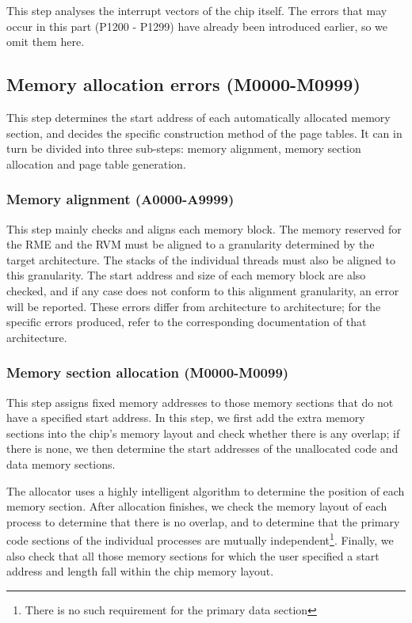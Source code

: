 This step analyses the interrupt vectors of the chip itself. The errors that may occur in this part (P1200 -\/
P1299) have already been introduced earlier, so we omit them here.

\subsection{Memory allocation errors (M0000-M0999)}\label{subsec:5-6-4}

This step determines the start address of each automatically allocated memory section, and decides the specific construction method of the page tables. It can in turn be divided into three sub-steps: memory alignment, memory section allocation and page table generation.

\subsubsection{Memory alignment (A0000-A9999)}\label{subsubsec:5-6-4-1}

This step mainly checks and aligns each memory block. The memory reserved for the RME and the RVM must be aligned to a granularity determined by the target architecture. The stacks of the individual threads must also be aligned to this granularity. The start address and size of each memory block are also checked, and if any case does not conform to this alignment granularity, an error will be reported. These errors differ from architecture to architecture; for the specific errors produced, refer to the corresponding documentation of that architecture.

\subsubsection{Memory section allocation (M0000-M0099)}\label{subsubsec:5-6-4-2}

This step assigns fixed memory addresses to those memory sections that do not have a specified start address. In this step, we first add the extra memory sections into the chip's memory layout and check whether there is any overlap; if there is none, we then determine the start addresses of the unallocated code and data memory sections.

The allocator uses a highly intelligent algorithm to determine the position of each memory section. After allocation finishes, we check the memory layout of each process to determine that there is no overlap, and to determine that the primary code sections of the individual processes are mutually independent\footnote{There is no such requirement for the primary data section}. Finally, we also check that all those memory sections for which the user specified a start address and length fall within the chip memory layout.

